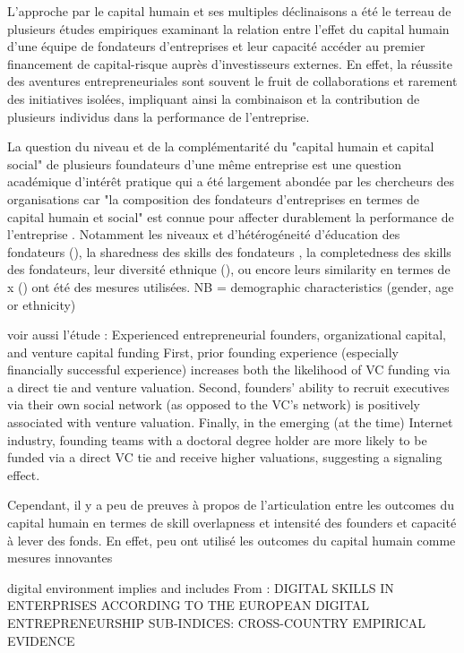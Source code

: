 \documentclass[11pt]{article}
\begin{document}
L'approche par le capital humain et ses multiples déclinaisons a été le terreau de plusieurs études empiriques examinant la relation entre l'effet du capital humain d'une équipe de fondateurs d'entreprises et leur capacité accéder au premier financement de capital-risque auprès d'investisseurs externes. En effet, la réussite des aventures entrepreneuriales sont souvent le fruit de collaborations et rarement des initiatives isolées, impliquant ainsi la combinaison et la contribution de plusieurs individus dans la performance de l'entreprise.

La question du niveau et de la complémentarité du "capital humain et capital social" de plusieurs foundateurs d'une même entreprise est une question académique d'intérêt pratique qui a été largement abondée par les chercheurs des organisations car "la composition des fondateurs d'entreprises en termes de capital humain et social" est connue pour affecter durablement la performance de l'entreprise \citet{colombo2005founders, unger2011human}. Notamment les niveaux et d'hétérogéneité d'éducation des fondateurs (\citet{pinelli2020too}), la sharedness des skills des fondateurs \citet{reese2020should}, la completedness des skills des fondateurs, leur diversité ethnique (\citet{wise2022startup}), ou encore leurs similarity en termes de x (\citet{singhal2022data}) ont été des mesures utilisées. NB = demographic characteristics (gender, age or ethnicity)

voir aussi l'étude : Experienced entrepreneurial founders, organizational capital, and venture capital funding
First, prior founding experience (especially financially successful experience) increases both the likelihood of VC funding via a direct tie and venture valuation. Second, founders’ ability to recruit executives via their own social network (as opposed to the VC’s network) is positively associated with venture valuation. Finally, in the emerging (at the time) Internet industry, founding teams with a doctoral degree holder are more likely to be funded via a direct VC tie and receive higher valuations, suggesting a signaling effect.

Cependant, il y a peu de preuves à propos de l'articulation entre les outcomes du capital humain en termes de skill overlapness et intensité des founders et capacité à lever des fonds. En effet, peu ont utilisé les outcomes du capital humain comme mesures innovantes \citep{marvel2016human}

digital environment implies and includes
From : DIGITAL SKILLS IN ENTERPRISES ACCORDING TO THE EUROPEAN DIGITAL ENTREPRENEURSHIP SUB-INDICES: CROSS-COUNTRY EMPIRICAL EVIDENCE
\end{document}
